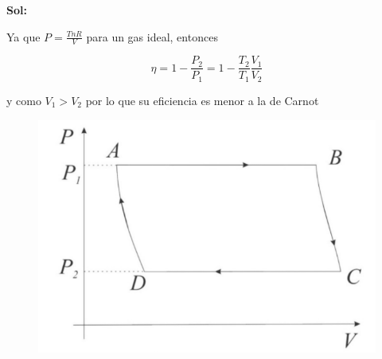 \documentclass[12pt,a4paper]{article}
\begin{document}
\begin{enumerate}
\begin{enumerate}
        \textbf{Sol:}
        
        Ya que $P = \frac{TnR}{V}$ para un gas ideal, entonces
        
        \begin{equation*}
            \eta = 1 - \frac{P_2}{P_1} = 1 - \frac{T_2}{T_1} \frac{V_1}{V_2}
        \end{equation*}
        
        y como $V_1 > V_2$ por lo  que su eficiencia es menor a la de Carnot
        
    \end{enumerate}
    
    \begin{figure}[h!]
        \centering
        \includegraphics[scale = 0.8]{1.PNG}
    \end{figure}
    
    
\end{enumerate}
\end{document}
